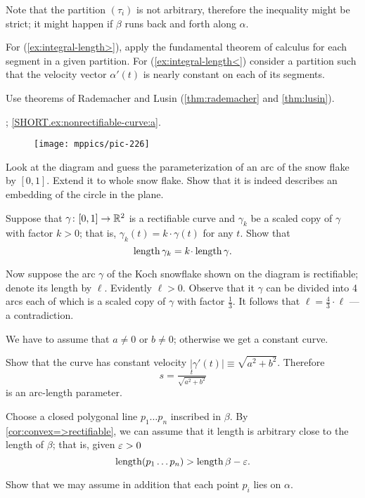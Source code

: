 Note that the partition $(\tau_i)$ is not arbitrary, therefore the inequality might be strict; it might happen if $\beta$ runs back and forth along $\alpha$.




 For (\ref{ex:integral-length>}), apply the fundamental theorem of calculus for each segment in a given partition. For (\ref{ex:integral-length<}) consider a partition such that the velocity vector $\alpha'(t)$ is nearly constant on each of its segments.

 Use theorems of Rademacher and Lusin (\ref{thm:rademacher} and \ref{thm:lusin}).

\parbf{\ref{ex:nonrectifiable-curve}}; \ref{SHORT.ex:nonrectifiable-curve:a}.
\begin{figure}[h!]
\vskip-0mm
\centering
\texttt{[image: mppics/pic-226]}
\vskip0mm
\end{figure}
Look at the diagram and guess the parameterization of an arc of the snow flake by $[0,1]$.
Extend it to whole snow flake.
Show that it is indeed describes an embedding of the circle in the plane.

Suppose that $\gamma\colon[0,1]\to\mathbb{R}^2$ is a rectifiable curve and $\gamma_k$ be a scaled copy of $\gamma$ with factor $k>0$;
that is, $\gamma_k(t)=k\cdot\gamma(t)$ for any $t$.
Show that 
\[\length\gamma_k=k\cdot\length \gamma.\]

Now suppose the arc $\gamma$ of the Koch snowflake shown on the diagram is rectifiable; denote its length by $\ell$.
Evidently $\ell>0$.
Observe that it $\gamma$ can be divided into 4 arcs each of which is a scaled copy of $\gamma$ with factor $\tfrac13$.
It follows that $\ell=\tfrac43\cdot\ell$ --- a contradiction.


We have to assume that $a\ne 0$ or $b\ne0$;
otherwise we get a constant curve.

Show that the curve has constant velocity $|\gamma'(t)|\equiv \sqrt{a^2+b^2}$.
Therefore 
\[s=\tfrac{t}{\sqrt{a^2+b^2}}\] is an arc-length parameter.


Choose a closed polygonal line $p_1\dots p_n$ inscribed in $\beta$.
By \ref{cor:convex=>rectifiable}, we can assume that it length is arbitrary close to the length of $\beta$;
that is, given $\varepsilon>0$ 
\[\mathop{\rm length}\nolimits (p_1\dots p_n)>\mathop{\rm length}\nolimits\beta-\varepsilon.\]

Show that we may assume in addition that each point $p_i$ lies on $\alpha$.

